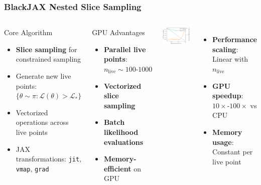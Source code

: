 \documentclass[aspectratio=169]{beamer}
\begin{document}
\begin{frame}
    \frametitle{BlackJAX Nested Slice Sampling}
    \begin{columns}
        \begin{block}{Core Algorithm}
            \begin{itemize}
                \item \textbf{Slice sampling} for constrained sampling
                \item Generate new live points: $\{\theta \sim \pi : \mathcal{L}(\theta) > \mathcal{L}_*\}$
                \item Vectorized operations across live points
                \item JAX transformations: \texttt{jit}, \texttt{vmap}, \texttt{grad}
            \end{itemize}
        \end{block}
        \begin{block}{GPU Advantages}
            \begin{itemize}
                \item \textbf{Parallel live points}: $n_{\text{live}} \sim 100\text{-}1000$
                \item \textbf{Vectorized slice sampling}
                \item \textbf{Batch likelihood evaluations}
                \item \textbf{Memory-efficient} on GPU
            \end{itemize}
        \end{block}
        \includegraphics[width=\textwidth]{figures/scaling}
        \vspace{10pt}
        \begin{itemize}
            \item \textbf{Performance scaling}: Linear with $n_{\text{live}}$
            \item \textbf{GPU speedup}: $10\times$-$100\times$ vs CPU
            \item \textbf{Memory usage}: Constant per live point
        \end{itemize}
    \end{columns}
\end{frame}
\end{document}
